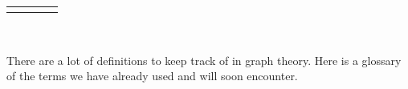 \documentclass[10pt,]{book}
\theoremstyle{plain}
\theoremstyle{definition}
\theoremstyle{definition}
\theoremstyle{definition}
\theoremstyle{definition}
\numberwithin{equation}{chapter}
\newlength{\panelmax}
\begin{document}
\begin{assemblage}
{\begin{tabular}{@{}*{4}{c}@{}}
\begin{minipage}[c][\panelmax][b]{0.2\linewidth}\usebox{\panelboxBimage}\end{minipage}&
\begin{minipage}[c][\panelmax][b]{0.15\linewidth}\usebox{\panelboxCimage}\end{minipage}&
\begin{minipage}[c][\panelmax][b]{0.24\linewidth}\usebox{\panelboxDimage}\end{minipage}\end{tabular}\\
}%
\end{assemblage}
\hypertarget{p-1533}{}%
There are a lot of definitions to keep track of in graph theory.  Here is a glossary of the terms we have already used and will soon encounter.%
\end{document}
